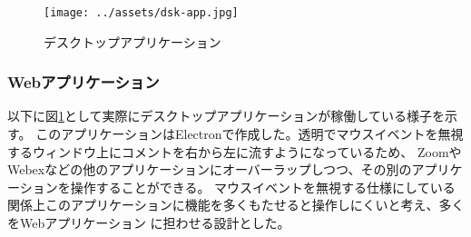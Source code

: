 \documentclass[a4j,twocolumn]{ujarticle}
\begin{document}
\vspace{3cm}
\begin{figure}[h]
\centering
\texttt{[image: ../assets/dsk-app.jpg]}
\caption{デスクトップアプリケーション}
\label{dsk-app}
\end{figure}

\subsubsection{Webアプリケーション}
以下に図\ref{dsk-app}として実際にデスクトップアプリケーションが稼働している様子を示す。
このアプリケーションはElectronで作成した。透明でマウスイベントを無視するウィンドウ上にコメントを右から左に流すようになっているため、
ZoomやWebexなどの他のアプリケーションにオーバーラップしつつ、その別のアプリケーションを操作することができる。
マウスイベントを無視する仕様にしている関係上このアプリケーションに機能を多くもたせると操作しにくいと考え、多くをWebアプリケーション
に担わせる設計とした。



\end{document}
